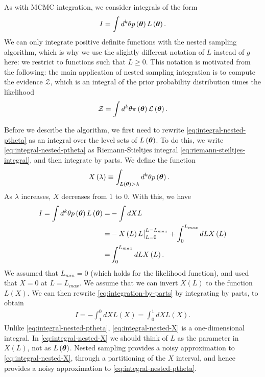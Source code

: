 As with MCMC integration, we consider integrals of the form
\begin{align}
    \label{eq:integral-nested-ptheta}
    I
    =
    \int d^k\theta p\left({\bm \theta}\right) L\left({\bm \theta}\right)
    .
\end{align}
We can only integrate positive definite functions with the nested sampling algorithm, which is why we use the slightly different notation of $L$ instead of $g$ here: we restrict to functions such that $L\geq0$.
This notation is motivated from the following: the main application of nested sampling integration is to compute the evidence $\mathcal{Z}$, which is an integral of the prior probability distribution times the likelihood
\begin{align}
    \mathcal{Z}
    =
    \int d^k\theta \pi\left({\bm \theta}\right) \mathcal{L}\left({\bm \theta}\right)
    .
\end{align}

Before we describe the algorithm, we first need to rewrite \eqref{eq:integral-nested-ptheta}
as an integral over the level sets of $L\left({\bm \theta}\right)$.
To do this, we write \eqref{eq:integral-nested-ptheta} as Riemann-Stieltjes integral
\eqref{eq:riemann-steiltjes-integral}, and then integrate by parts.
We define the function
\begin{align}
    \label{eq:F-NS-int}
    X\left(\lambda\right)
    &\equiv
    \int_{L\left({\bm \theta}\right)>\lambda} d^k\theta p\left({\bm \theta}\right)
    .
\end{align}
As $\lambda$ increases, $X$ decreases from $1$ to $0$.
With this, we have
\begin{align}
    \label{eq:integration-by-parts}
    I
    =
    \int d^k \theta p\left({\bm \theta}\right) L\left({\bm \theta}\right)
    =&
    -
    \int dX L
    \nonumber\\
    =&
    -
    X\left(L\right) L\big|_{L=0}^{L=L_{max}}
    +
    \int_0^{L_{max}} dL X\left(L\right)
    \nonumber\\
    =&
    \int_0^{L_{max}} dL X\left(L\right)
    .
\end{align}
We assumed that $L_{min}=0$ (which holds for the likelihood function), and used that $X=0$ at $L=L_{max}$. 
We assume that we can invert $X\left(L\right)$ to the function $L\left(X\right)$.
We can then rewrite \eqref{eq:integration-by-parts} by integrating by parts, to obtain
\begin{align}
    \label{eq:integral-nested-X}
    I
    =
    -
    \int_1^0 dX L\left(X\right)
    =
    \int_0^1 dX L\left(X\right)
    .
\end{align}
Unlike \eqref{eq:integral-nested-ptheta}, \eqref{eq:integral-nested-X}
is a one-dimensional integral. 
In \eqref{eq:integral-nested-X} we should think of $L$ as the parameter
in $X\left(L\right)$, not as $L\left({\bm \theta}\right)$.
Nested sampling provides a noisy approximation to \eqref{eq:integral-nested-X}, through a partitioning of the $X$ interval, and hence provides a noisy approximation to \eqref{eq:integral-nested-ptheta}.

